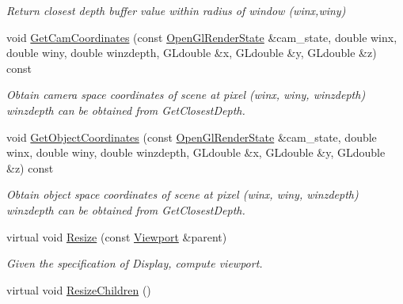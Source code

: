 \begin{DoxyCompactItemize}
\begin{DoxyCompactList}\small\item\em Return closest depth buffer value within radius of window (winx,winy) \end{DoxyCompactList}\item 
void \hyperlink{structpangolin_1_1_view_a5b1f17180681ccbf4c9a0085035b9480}{Get\+Cam\+Coordinates} (const \hyperlink{classpangolin_1_1_open_gl_render_state}{Open\+Gl\+Render\+State} \&cam\+\_\+state, double winx, double winy, double winzdepth, G\+Ldouble \&x, G\+Ldouble \&y, G\+Ldouble \&z) const \hypertarget{structpangolin_1_1_view_a5b1f17180681ccbf4c9a0085035b9480}{}\label{structpangolin_1_1_view_a5b1f17180681ccbf4c9a0085035b9480}

\begin{DoxyCompactList}\small\item\em Obtain camera space coordinates of scene at pixel (winx, winy, winzdepth) winzdepth can be obtained from Get\+Closest\+Depth. \end{DoxyCompactList}\item 
void \hyperlink{structpangolin_1_1_view_a5c0aa6e20acadcafc409f1e7b204edad}{Get\+Object\+Coordinates} (const \hyperlink{classpangolin_1_1_open_gl_render_state}{Open\+Gl\+Render\+State} \&cam\+\_\+state, double winx, double winy, double winzdepth, G\+Ldouble \&x, G\+Ldouble \&y, G\+Ldouble \&z) const \hypertarget{structpangolin_1_1_view_a5c0aa6e20acadcafc409f1e7b204edad}{}\label{structpangolin_1_1_view_a5c0aa6e20acadcafc409f1e7b204edad}

\begin{DoxyCompactList}\small\item\em Obtain object space coordinates of scene at pixel (winx, winy, winzdepth) winzdepth can be obtained from Get\+Closest\+Depth. \end{DoxyCompactList}\item 
virtual void \hyperlink{structpangolin_1_1_view_a2a553103066f757e090152fd0b61755e}{Resize} (const \hyperlink{structpangolin_1_1_viewport}{Viewport} \&parent)\hypertarget{structpangolin_1_1_view_a2a553103066f757e090152fd0b61755e}{}\label{structpangolin_1_1_view_a2a553103066f757e090152fd0b61755e}

\begin{DoxyCompactList}\small\item\em Given the specification of Display, compute viewport. \end{DoxyCompactList}\item 
virtual void \hyperlink{structpangolin_1_1_view_ac0587430aec6215e0aa4c3028b77c0cb}{Resize\+Children} ()\hypertarget{structpangolin_1_1_view_ac0587430aec6215e0aa4c3028b77c0cb}{}\label{structpangolin_1_1_view_ac0587430aec6215e0aa4c3028b77c0cb}


\end{DoxyCompactItemize}
